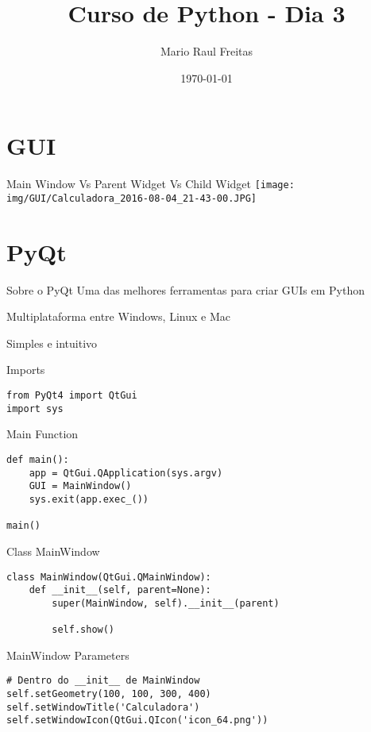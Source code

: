 \documentclass[presentation]{beamer}
\author{Mario Raul Freitas}
\date{\today}
\title{Curso de Python - Dia 3}
\begin{document}
\maketitle

\section{GUI}
\label{sec:orgheadline2}
\begin{frame}[label={sec:orgheadline1}]{Main Window Vs Parent Widget Vs Child Widget}
\texttt{[image: img/GUI/Calculadora\_2016-08-04\_21-43-00.JPG]}
\end{frame}
\section{PyQt}
\label{sec:orgheadline13}
\begin{frame}[label={sec:orgheadline3}]{Sobre o PyQt}
Uma das melhores ferramentas para criar GUIs em Python

Multiplataforma entre Windows, Linux e Mac

Simples e intuitivo
\end{frame}
\begin{frame}[fragile,label={sec:orgheadline4}]{Imports}
 \begin{verbatim}
from PyQt4 import QtGui
import sys
\end{verbatim}
\end{frame}
\begin{frame}[fragile,label={sec:orgheadline5}]{Main Function}
 \begin{verbatim}
def main():
    app = QtGui.QApplication(sys.argv)
    GUI = MainWindow()
    sys.exit(app.exec_())

main()
\end{verbatim}
\end{frame}
\begin{frame}[fragile,label={sec:orgheadline6}]{Class MainWindow}
 \begin{verbatim}
class MainWindow(QtGui.QMainWindow):
    def __init__(self, parent=None):
        super(MainWindow, self).__init__(parent)

        self.show()
\end{verbatim}
\end{frame}
\begin{frame}[fragile,label={sec:orgheadline7}]{MainWindow Parameters}
 \begin{verbatim}
# Dentro do __init__ de MainWindow
self.setGeometry(100, 100, 300, 400)
self.setWindowTitle('Calculadora')
self.setWindowIcon(QtGui.QIcon('icon_64.png'))
\end{verbatim}
\end{frame}
\end{document}
